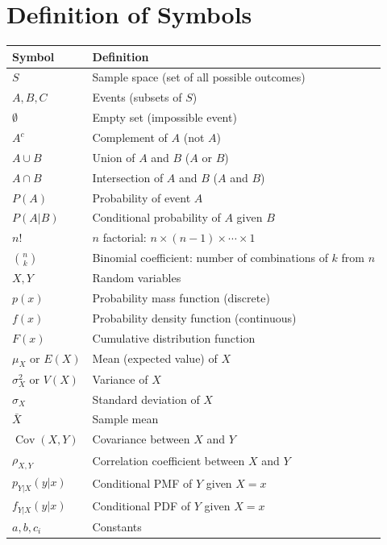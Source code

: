 \documentclass[11pt]{article}
\begin{document}
\section*{Definition of Symbols}
{\small
\begin{center}
\begin{tabular}{l l}
\toprule
\textbf{Symbol} & \textbf{Definition} \\
\midrule
\(S\) & Sample space (set of all possible outcomes) \\
\(A, B, C\) & Events (subsets of \(S\)) \\
\(\emptyset\) & Empty set (impossible event) \\
\(A^c\) & Complement of \(A\) (not \(A\)) \\
\(A \cup B\) & Union of \(A\) and \(B\) (\(A\) or \(B\)) \\
\(A \cap B\) & Intersection of \(A\) and \(B\) (\(A\) and \(B\)) \\
\(P(A)\) & Probability of event \(A\) \\
\(P(A|B)\) & Conditional probability of \(A\) given \(B\) \\
\(n!\) & \(n\) factorial: \(n\times(n-1)\times\cdots\times1\) \\
\(\binom{n}{k}\) & Binomial coefficient: number of combinations of \(k\) from \(n\) \\
\(X, Y\) & Random variables \\
\(p(x)\) & Probability mass function (discrete) \\
\(f(x)\) & Probability density function (continuous) \\
\(F(x)\) & Cumulative distribution function \\
\(\mu_X\) or \(E(X)\) & Mean (expected value) of \(X\) \\
\(\sigma_X^2\) or \(V(X)\) & Variance of \(X\) \\
\(\sigma_X\) & Standard deviation of \(X\) \\
\(\bar{X}\) & Sample mean \\
\(\operatorname{Cov}(X,Y)\) & Covariance between \(X\) and \(Y\) \\
\(\rho_{X,Y}\) & Correlation coefficient between \(X\) and \(Y\) \\
\(p_{Y|X}(y|x)\) & Conditional PMF of \(Y\) given \(X=x\) \\
\(f_{Y|X}(y|x)\) & Conditional PDF of \(Y\) given \(X=x\) \\
\(a, b, c_i\) & Constants \\
\bottomrule
\end{tabular}
\end{center}
}
\end{document}
